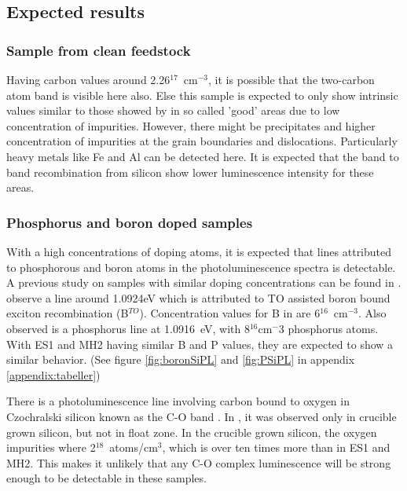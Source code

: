 \subsection{Expected results}


\subsubsection{Sample from clean feedstock}

Having carbon values around 2.26$^{17}$~cm$^{-3}$, it is possible that the two-carbon atom band is visible here also. Else this sample is expected to only show intrinsic values similar to those showed by \cite{dean67} in so called 'good' areas due to low concentration of impurities. However, there might be precipitates and higher concentration of impurities at the grain boundaries and dislocations. Particularly heavy metals like Fe and Al can be detected here. It is expected that the band to band recombination from silicon show lower luminescence intensity for these areas.




\subsubsection{Phosphorus and boron doped samples}

With a high concentrations of doping atoms, it is expected that lines attributed to phosphorous and boron atoms in the photoluminescence spectra is detectable. A previous study on samples with similar doping concentrations can be found in \cite{dean67}. \cite{dean67} observe a line around 1.0924eV which is attributed to TO assisted boron bound exciton recombination (B$^{TO}$). Concentration values for B in \cite{dean67} are 6$^{16}$~cm$^{-3}$. Also observed is a phosphorus line at 1.0916~eV, with 8$^{16}$cm$^-3$ phosphorus atoms. With ES1 and MH2 having similar B and P values, they are expected to show a similar behavior. (See figure \ref{fig:boronSiPL} and \ref{fig:PSiPL} in appendix \ref{appendix:tabeller})

There is a photoluminescence line involving carbon bound to oxygen in Czochralski silicon known as the C-O band \cite{davies88}. In \cite{hare72}, it was observed only in crucible grown silicon, but not in float zone. In the crucible grown silicon, the oxygen impurities where 2$^{18}$~atoms/cm$^3$, which is over ten times more than in ES1 and MH2. This makes it unlikely that any C-O complex luminescence will be strong enough to be detectable in these samples.

